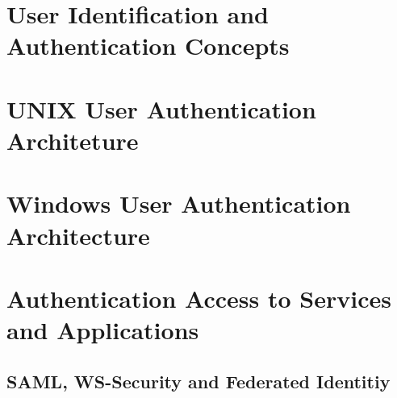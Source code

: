\documentclass[12pt,a4paper]{univention}
\author{Julia Bremer}
\begin{document}
\tableofcontents
\newpage
\section{User Identification and Authentication Concepts}
\section{UNIX User Authentication Architeture}
\section{Windows User Authentication Architecture}
\section{Authentication Access to Services and Applications}
\subsection{SAML, WS-Security and Federated Identitiy}
\end{document}
